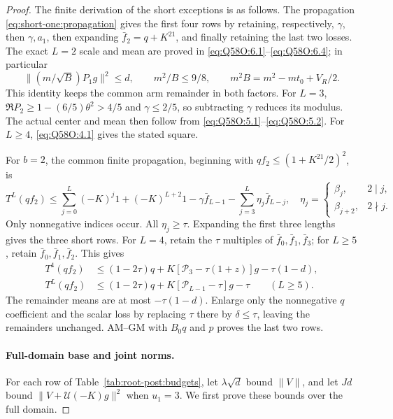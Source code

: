 \begin{proof}
The finite derivation of the short exceptions is as follows.
The propagation \eqref{eq:short-one:propagation} gives the first
four rows by retaining, respectively, \(\gamma\), then \(\gamma,a_1\),
then expanding \(\bar f_2=q+K^21\), and finally retaining the last
two losses. The exact \(L=2\) scale and mean are proved in
\eqref{eq:Q58O:6.1}--\eqref{eq:Q58O:6.4}; in particular
\[
 \|(m/\sqrt B)P_1g\|^2\le d,\qquad
 m^2/B\le9/8,\qquad m^2B=m^2-mt_0+V_R/2 .
\]
This identity keeps the common arm remainder in both factors.
For \(L=3\), \(\Re P_2\ge1-(6/5)\theta^2>4/5\) and
\(\gamma\le2/5\), so subtracting \(\gamma\) reduces its modulus.
The actual center and mean then follow from
\eqref{eq:Q58O:5.1}--\eqref{eq:Q58O:5.2}.
For \(L\ge4\), \eqref{eq:Q58O:4.1} gives the stated square.

For \(b=2\), the common finite propagation, beginning with
\(qf_2\le(1+K^21/2)^2\), is
\[
 T^L(qf_2)\le
 \sum_{j=0}^L(-K)^j1+(-K)^{L+2}1
 -\gamma\bar f_{L-1}-\sum_{j=3}^L\eta_j\bar f_{L-j},
 \quad
 \eta_j=\begin{cases}\beta_j,&2\mid j,\\\beta_{j+2},&2\nmid j.\end{cases}
\]
Only nonnegative indices occur. All \(\eta_j\ge\tau\).
Expanding the first three lengths gives the three short rows.
For \(L=4\), retain the \(\tau\) multiples of
\(\bar f_0,\bar f_1,\bar f_3\); for \(L\ge5\), retain
\(\bar f_0,\bar f_1,\bar f_2\). This gives
\begin{equation}\label{eq:root-post:b2-tail}
 \begin{aligned}
 T^4(qf_2)&\le(1-2\tau)q+
 K[\mathcal P_3-\tau(1+z)]g-\tau(1-d),\\
 T^L(qf_2)&\le(1-2\tau)q+
 K[\mathcal P_{L-1}-\tau]g-\tau\qquad(L\ge5).
 \end{aligned}
\end{equation}
The remainder means are at most \(-\tau(1-d)\). Enlarge only the
nonnegative \(q\) coefficient and the scalar loss by replacing
\(\tau\) there by \(\delta\le\tau\), leaving the remainders unchanged.
AM--GM with \(B_0q\) and \(p\) proves the last two rows.


\paragraph{Full-domain base and joint norms.}\label{part:root-post:joint-norms}
For each row of Table~\ref{tab:root-post:budgets}, let
\(\lambda\sqrt d\) bound \(\|V\|\), and let \(Jd\) bound
\(\|V+\mathcal U(-K)g\|^2\) when \(u_1=3\).
We first prove these bounds over the full domain.


\end{proof}
